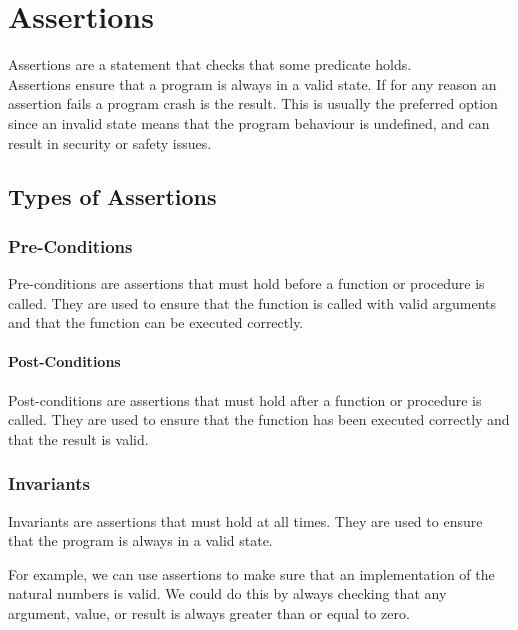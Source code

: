 \chapter{Assertions}
Assertions are a statement that checks that some predicate holds.\\
Assertions ensure that a program is always in a valid state.
If for any reason an assertion fails a program crash is the result.
This is usually the preferred option since an invalid state means that the program behaviour is undefined, and can result in security or safety issues.

\section{Types of Assertions}
\subsection*{Pre-Conditions}
Pre-conditions are assertions that must hold before a function or procedure is called.
They are used to ensure that the function is called with valid arguments and that the function can be executed correctly.

\subsubsection*{Post-Conditions}
Post-conditions are assertions that must hold after a function or procedure is called.
They are used to ensure that the function has been executed correctly and that the result is valid.

\subsection*{Invariants}
Invariants are assertions that must hold at all times.
They are used to ensure that the program is always in a valid state.

For example, we can use assertions to make sure that an implementation of the natural numbers is valid.
We could do this by always checking that any argument, value, or result is always greater than or equal to zero.